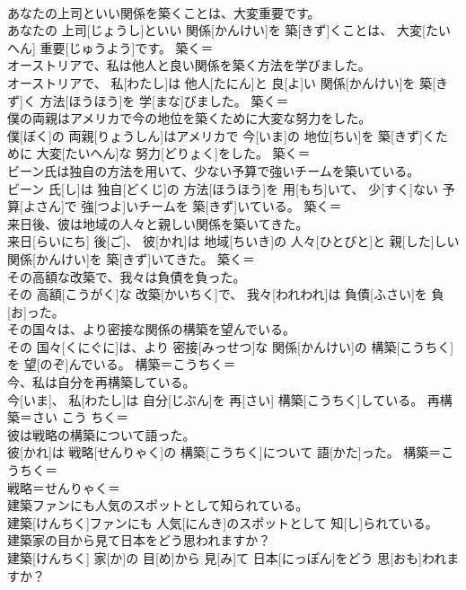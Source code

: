 \documentclass[8pt]{extreport}
\begin{document}
\begin{CJK}{UTF8}{min}
\\	あなたの上司といい関係を築くことは、大変重要です。	
\\	あなたの 上司[じょうし]といい 関係[かんけい]を 築[きず]くことは、 大変[たいへん] 重要[じゅうよう]です。	築く＝ 
\\	オーストリアで、私は他人と良い関係を築く方法を学びました。	
\\	オーストリアで、 私[わたし]は 他人[たにん]と 良[よ]い 関係[かんけい]を 築[きず]く 方法[ほうほう]を 学[まな]びました。	築く＝ 
\\	僕の両親はアメリカで今の地位を築くために大変な努力をした。	
\\	僕[ぼく]の 両親[りょうしん]はアメリカで 今[いま]の 地位[ちい]を 築[きず]くために 大変[たいへん]な 努力[どりょく]をした。	築く＝ 
\\	ビーン氏は独自の方法を用いて、少ない予算で強いチームを築いている。	
\\	ビーン 氏[し]は 独自[どくじ]の 方法[ほうほう]を 用[もち]いて、 少[すく]ない 予算[よさん]で 強[つよ]いチームを 築[きず]いている。	築く＝ 
\\	来日後、彼は地域の人々と親しい関係を築いてきた。	
\\	来日[らいにち] 後[ご]、 彼[かれ]は 地域[ちいき]の 人々[ひとびと]と 親[した]しい 関係[かんけい]を 築[きず]いてきた。	築く＝ 
\\	その高額な改築で、我々は負債を負った。	
\\	その 高額[こうがく]な 改築[かいちく]で、 我々[われわれ]は 負債[ふさい]を 負[お]った。	
\\	その国々は、より密接な関係の構築を望んでいる。	
\\	その 国々[くにぐに]は、より 密接[みっせつ]な 関係[かんけい]の 構築[こうちく]を 望[のぞ]んでいる。	構築＝こうちく＝ 
\\	今、私は自分を再構築している。	
\\	今[いま]、 私[わたし]は 自分[じぶん]を 再[さい] 構築[こうちく]している。	再構築＝さい こう ちく＝ 
\\	彼は戦略の構築について語った。	
\\	彼[かれ]は 戦略[せんりゃく]の 構築[こうちく]について 語[かた]った。	構築＝こうちく＝ 
\\	戦略＝せんりゃく＝ 
\\	建築ファンにも人気のスポットとして知られている。	
\\	建築[けんちく]ファンにも 人気[にんき]のスポットとして 知[し]られている。	
\\	建築家の目から見て日本をどう思われますか？	
\\	建築[けんちく] 家[か]の 目[め]から 見[み]て 日本[にっぽん]をどう 思[おも]われますか？	

\end{CJK}
\end{document}

